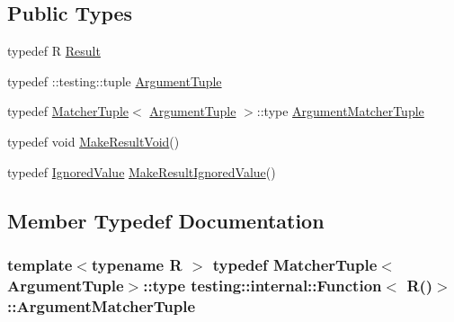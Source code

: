 \subsection*{Public Types}
\begin{DoxyCompactItemize}
\item 
typedef R \hyperlink{structtesting_1_1internal_1_1Function_3_01R_07_08_4_a5c228a886ef598ac10988f8de5e32ca1}{Result}
\item 
typedef \+::testing\+::tuple \hyperlink{structtesting_1_1internal_1_1Function_3_01R_07_08_4_ad483c3128c470d8cdb55c3ac1c575c11}{Argument\+Tuple}
\item 
typedef \hyperlink{structtesting_1_1internal_1_1MatcherTuple}{Matcher\+Tuple}$<$ \hyperlink{structtesting_1_1internal_1_1Function_3_01R_07_08_4_ad483c3128c470d8cdb55c3ac1c575c11}{Argument\+Tuple} $>$\+::type \hyperlink{structtesting_1_1internal_1_1Function_3_01R_07_08_4_a9bec5cf8937e8af99dedab2f40129fab}{Argument\+Matcher\+Tuple}
\item 
typedef void \hyperlink{structtesting_1_1internal_1_1Function_3_01R_07_08_4_a666b5ad3bf155529d3a0f9fe6d5c897b}{Make\+Result\+Void}()
\item 
typedef \hyperlink{classtesting_1_1internal_1_1IgnoredValue}{Ignored\+Value} \hyperlink{structtesting_1_1internal_1_1Function_3_01R_07_08_4_aa459093a5b52ef54e2544b5a6c054383}{Make\+Result\+Ignored\+Value}()
\end{DoxyCompactItemize}


\subsection{Member Typedef Documentation}
\subsubsection[{\texorpdfstring{Argument\+Matcher\+Tuple}{ArgumentMatcherTuple}}]{\setlength{\rightskip}{0pt plus 5cm}template$<$typename R $>$ typedef {\bf Matcher\+Tuple}$<${\bf Argument\+Tuple}$>$\+::type {\bf testing\+::internal\+::\+Function}$<$ R()$>$\+::{\bf Argument\+Matcher\+Tuple}}\hypertarget{structtesting_1_1internal_1_1Function_3_01R_07_08_4_a9bec5cf8937e8af99dedab2f40129fab}{}\label{structtesting_1_1internal_1_1Function_3_01R_07_08_4_a9bec5cf8937e8af99dedab2f40129fab}
